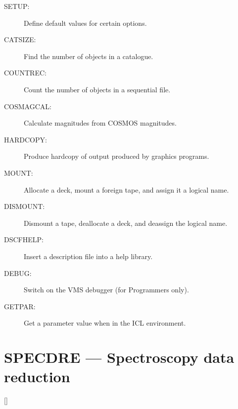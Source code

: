 \begin{description}
\begin{description}
\item [SETUP:]  Define default values for certain options.
\item [CATSIZE:]  Find the number of objects in a catalogue.
\item [COUNTREC:]  Count the number of objects in a sequential file.
\item [COSMAGCAL:]  Calculate magnitudes from COSMOS magnitudes.
\item [HARDCOPY:]  Produce hardcopy of output produced by graphics programs.
\item [MOUNT:]  Allocate a deck, mount a foreign tape, and assign it a
 logical name.
\item [DISMOUNT:]  Dismount a tape, deallocate a deck, and deassign the
 logical name.
\item [DSCFHELP:]  Insert a description file into a help library.
\item [DEBUG:]  Switch on the VMS debugger (for Programmers only).
\item [GETPAR:]  Get a parameter value when in the ICL environment.
\end{description}
\end{description}

\newpage

\section{SPECDRE --- Spectroscopy data reduction}

\vspace{-10mm}

\hfill []

\vspace{2mm}

